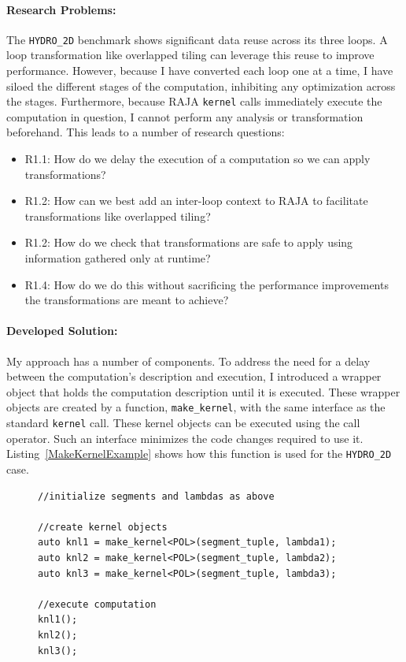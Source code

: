 \documentclass{article}
\begin{document}
\paragraph{Research Problems:}
The \verb.HYDRO_2D. benchmark shows significant data reuse across its three loops.
A loop transformation like overlapped tiling can leverage this reuse to improve performance.
However, because I have converted each loop one at a time, I have siloed the different stages of the computation, inhibiting any optimization across the stages.
Furthermore, because RAJA \verb.kernel. calls immediately execute the computation in question, I cannot perform any analysis or transformation beforehand.
This leads to a number of research questions:
\begin{itemize}
\item R1.1: How do we delay the execution of a computation so we can apply transformations?
\item R1.2: How can we best add an inter-loop context to RAJA to facilitate transformations like overlapped tiling?
\item R1.2: How do we check that transformations are safe to apply using information gathered only at runtime?
\item R1.4: How do we do this without sacrificing the performance improvements the transformations are meant to achieve?
\end{itemize}

\paragraph{Developed Solution:}


My approach has a number of components.
To address the need for a delay between the computation's description and execution, I introduced a wrapper object that holds the computation description until it is executed.
These wrapper objects are created by a function, \verb.make_kernel., with the same interface as the standard \verb.kernel. call. 
These kernel objects can be executed using the call operator.
Such an interface minimizes the code changes required to use it.
Listing~\ref{MakeKernelExample} shows how this function is used for the \verb.HYDRO_2D. case.

\begin{figure}
    \begin{lstlisting}[caption={Example usage of the \texttt{make\_kernel} function.},label={MakeKernelExample}]
//initialize segments and lambdas as above

//create kernel objects
auto knl1 = make_kernel<POL>(segment_tuple, lambda1);
auto knl2 = make_kernel<POL>(segment_tuple, lambda2);
auto knl3 = make_kernel<POL>(segment_tuple, lambda3);

//execute computation
knl1();
knl2();
knl3();
    \end{lstlisting}
\end{figure}
\end{document}
